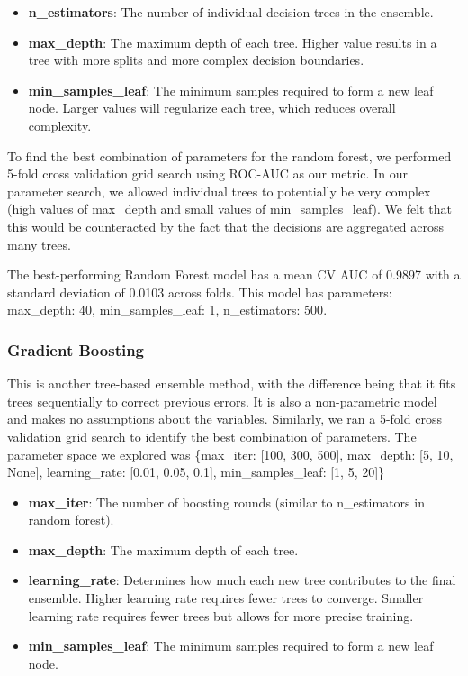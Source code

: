 \documentclass[10pt,letterpaper]{article}
\begin{document}
\begin{itemize}
    \item \textbf{n\_estimators}: The number of individual decision trees in the ensemble.
    \item \textbf{max\_depth}: The maximum depth of each tree. Higher value results in a tree with more splits and more complex decision boundaries.
    \item \textbf{min\_samples\_leaf}: The minimum samples required to form a new leaf node. Larger values will regularize each tree, which reduces overall complexity.
\end{itemize}

To find the best combination of parameters for the random forest, we performed 5-fold cross validation grid search using ROC-AUC as our metric. In our parameter search, we allowed individual trees to potentially be very complex (high values of max\_depth and small values of min\_samples\_leaf). We felt that this would be counteracted by the fact that the decisions are aggregated across many trees.

The best-performing Random Forest model has a mean CV AUC of 0.9897 with a standard deviation of 0.0103 across folds. This model has parameters: {max\_depth: 40, min\_samples\_leaf: 1, n\_estimators: 500}.


\subsubsection*{Gradient Boosting}

This is another tree-based ensemble method, with the difference being that it fits trees sequentially to correct previous errors. It is also a non-parametric model and makes no assumptions about the variables. Similarly, we ran a 5-fold cross validation grid search to identify the best combination of parameters. The parameter space we explored was \{max\_iter: [100, 300, 500], max\_depth: [5, 10, None], learning\_rate: [0.01, 0.05, 0.1], min\_samples\_leaf: [1, 5, 20]\}

\begin{itemize}
    \item \textbf{max\_iter}: The number of boosting rounds (similar to n\_estimators in random forest).
    \item \textbf{max\_depth}: The maximum depth of each tree.
    \item \textbf{learning\_rate}: Determines how much each new tree contributes to the final ensemble. Higher learning rate requires fewer trees to converge. Smaller learning rate requires fewer trees but allows for more precise training.
    \item \textbf{min\_samples\_leaf}: The minimum samples required to form a new leaf node.
\end{itemize}
\end{document}
